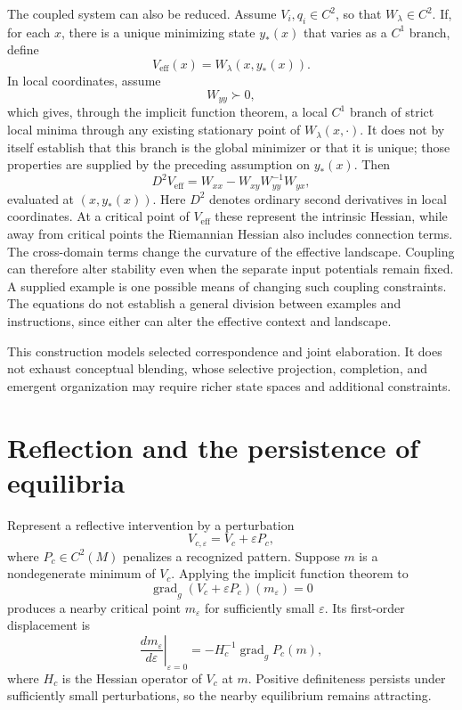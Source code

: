\documentclass[11pt]{article}
\begin{document}
The coupled system can also be reduced. Assume $V_i,q_i\in C^2$, so that $W_\lambda\in C^2$. If, for each $x$, there is a unique minimizing state $y_*(x)$ that varies as a $C^1$ branch, define
\[
V_{\mathrm{eff}}(x)=W_\lambda(x,y_*(x)).
\]
In local coordinates, assume
\[
W_{yy}\succ 0,
\]
which gives, through the implicit function theorem, a local $C^1$ branch of strict local minima through any existing stationary point of $W_\lambda(x,\cdot)$. It does not by itself establish that this branch is the global minimizer or that it is unique; those properties are supplied by the preceding assumption on $y_*(x)$. Then
\[
D^2V_{\mathrm{eff}}
=
W_{xx}-W_{xy}W_{yy}^{-1}W_{yx},
\]
evaluated at $(x,y_*(x))$. Here $D^2$ denotes ordinary second derivatives in local coordinates. At a critical point of $V_{\mathrm{eff}}$ these represent the intrinsic Hessian, while away from critical points the Riemannian Hessian also includes connection terms. The cross-domain terms change the curvature of the effective landscape. Coupling can therefore alter stability even when the separate input potentials remain fixed. A supplied example is one possible means of changing such coupling constraints. The equations do not establish a general division between examples and instructions, since either can alter the effective context and landscape.

This construction models selected correspondence and joint elaboration. It does not exhaust conceptual blending, whose selective projection, completion, and emergent organization may require richer state spaces and additional constraints.

\section{Reflection and the persistence of equilibria}

Represent a reflective intervention by a perturbation
\[
V_{c,\varepsilon}=V_c+\varepsilon P_c,
\]
where $P_c\in C^2(M)$ penalizes a recognized pattern. Suppose $m$ is a nondegenerate minimum of $V_c$. Applying the implicit function theorem to
\[
\operatorname{grad}_g(V_c+\varepsilon P_c)(m_\varepsilon)=0
\]
produces a nearby critical point $m_\varepsilon$ for sufficiently small $\varepsilon$. Its first-order displacement is
\[
\left.\frac{d m_\varepsilon}{d\varepsilon}\right|_{\varepsilon=0}
=
-H_c^{-1}\operatorname{grad}_g P_c(m),
\]
where $H_c$ is the Hessian operator of $V_c$ at $m$. Positive definiteness persists under sufficiently small perturbations, so the nearby equilibrium remains attracting.
\end{document}
